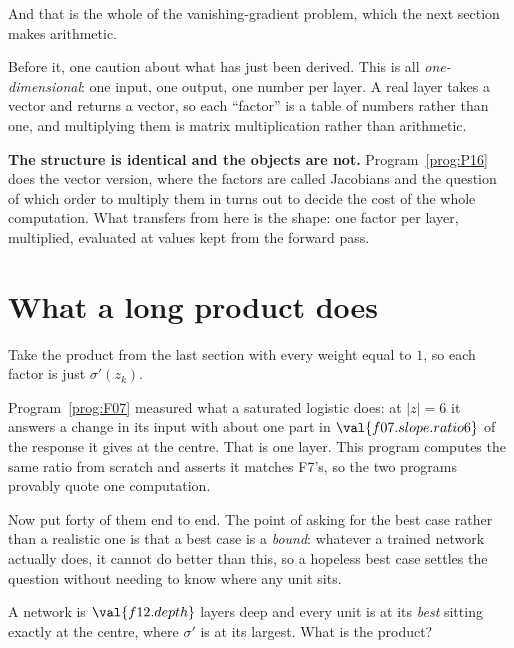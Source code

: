 \begin{fr}
And that is the whole of the vanishing-gradient problem, which the next
section makes arithmetic.

Before it, one caution about what has just been derived. This is all
\emph{one-dimensional}: one input, one output, one number per layer. A real
layer takes a vector and returns a vector, so each \enquote{factor} is a table
of numbers rather than one, and multiplying them is matrix multiplication
rather than arithmetic.

\textbf{The structure is identical and the objects are not.}
Program~\ref{prog:P16} does the vector version, where the factors are called
Jacobians and the question of which order to multiply them in turns out to
decide the cost of the whole computation. What transfers from here is the
shape: one factor per layer, multiplied, evaluated at values kept from the
forward pass.
\end{fr}

\section{What a long product does}
\label{sec:F12-vanishing}

\begin{fr}
Take the product from the last section with every weight equal to $1$, so each
factor is just $\sigma'(z_k)$.

Program~\ref{prog:F07} measured what a saturated logistic does: at
$\lvert z \rvert = 6$ it answers a change in its input with about one part in
$\val{f07.slope.ratio6}$ of the response it gives at the centre. That is one
layer. This program computes the same ratio from scratch and asserts it
matches F7's, so the two programs provably quote one computation.

Now put forty of them end to end. The point of asking for the best case
rather than a realistic one is that a best case is a \emph{bound}: whatever a
trained network actually does, it cannot do better than this, so a hopeless
best case settles the question without needing to know where any unit sits.

A network is $\val{f12.depth}$ layers deep and every unit is at its
\emph{best} \dash{} sitting exactly at the centre, where $\sigma'$ is at its
largest. What is the product?
\dotline
\nextframe
\end{fr}

